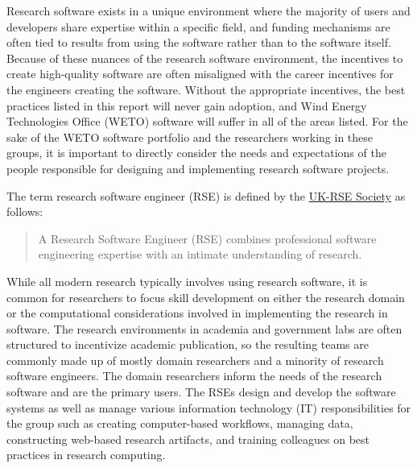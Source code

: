 \documentclass[]{nlr}
\begin{document}


\begin{appendices} %
    

    \label{app:A}

Research software exists in a unique environment where the majority of users and developers
share expertise within a specific field, and funding mechanisms are often tied to results
from using the software rather than to the software itself.
Because of these nuances of the research software environment, the incentives to create high-quality software are often misaligned with the career incentives for the engineers
creating the software.
Without the appropriate incentives, the best practices listed in this report will never gain
adoption, and Wind Energy Technologies Office (WETO) software will suffer in all of the areas listed.
For the sake of the WETO software portfolio and the researchers working in these groups,
it is important to directly consider the needs and expectations of the people
responsible for designing and implementing research software projects.

The term research software engineer (RSE) is defined by the
\href{https://society-rse.org/about/}{UK-RSE Society} as follows:

\begin{quote}
A Research Software Engineer (RSE) combines professional software engineering expertise with
an intimate understanding of research.
\end{quote}

While all modern research typically involves using research software, it is common for researchers
to focus skill development on either the research domain or the computational considerations
involved in implementing the research in software.
The research environments in academia and government labs are often structured to incentivize
academic publication, so the resulting teams are commonly made up of mostly domain researchers
and a minority of research software engineers.
The domain researchers inform the needs of the research software and are the primary users.
The RSEs design and develop the software systems as well as manage various information technology (IT) responsibilities
for the group such as creating computer-based workflows, managing data, constructing web-based
research artifacts, and training colleagues on best practices in research computing.


\end{appendices}
\end{document}
